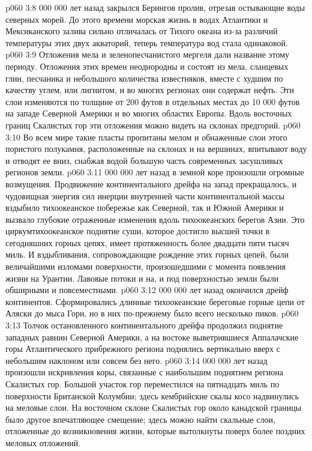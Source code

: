\vs p060 3:8  000 000 лет назад закрылся Берингов пролив, отрезав остывающие воды северных морей. До этого времени морская жизнь в водах Атлантики и Мексиканского залива сильно отличалась от Тихого океана из\hyp{}за различий температуры этих двух акваторий, теперь температура вод стала одинаковой.
\vs p060 3:9 Отложения мела и зеленопесчанистого мергеля дали название этому периоду. Отложения этих времен неоднородны и состоят из мела, сланцевых глин, песчаника и небольшого количества известняков, вместе с худшим по качеству углем, или лигнитом, и во многих регионах они содержат нефть. Эти слои изменяются по толщине от 200 футов в отдельных местах до 10 000 футов на западе Северной Америки и во многих областях Европы. Вдоль восточных границ Скалистых гор эти отложения можно видеть на склонах предгорий.
\vs p060 3:10 Во всем мире такие пласты пропитаны мелом и обнаженные слои этого пористого полукамня, расположенные на склонах и на вершинах, впитывают воду и отводят ее вниз, снабжая водой большую часть современных засушливых регионов земли.
\vs p060 3:11  000 000 лет назад в земной коре произошли огромные возмущения. Продвижение континентального дрейфа на запад прекращалось, и чудовищная энергия сил инерции внутренней части континентальной массы вздыбило тихоокеанское побережье как Северной, так и Южной Америки и вызвало глубокие отраженные изменения вдоль тихоокеанских берегов Азии. Это циркумтихоокеанское поднятие суши, которое достигло высшей точки в сегодняшних горных цепях, имеет протяженность более двадцати пяти тысяч миль. И вздыбливания, сопровождающие рождение этих горных цепей, были величайшими изломами поверхности, произошедшими с момента появления жизни на Урантии. Лавовые потоки и на, и под поверхностью земли были обширными и повсеместными.
\vs p060 3:12  000 000 лет назад окончился дрейф континентов. Сформировались длинные тихоокеанские береговые горные цепи от Аляски до мыса Горн, но в них по\hyp{}прежнему было всего несколько пиков.
\vs p060 3:13 Толчок остановленного континентального дрейфа продолжил поднятие западных равнин Северной Америки, а на востоке выветрившиеся Аппалачские горы Атлантического прибрежного региона поднялись вертикально вверх с небольшим наклоном или совсем без него.
\vs p060 3:14  000 000 лет назад произошли искривления коры, связанные с наибольшим поднятием региона Скалистых гор. Большой участок гор переместился на пятнадцать миль по поверхности Британской Колумбии; здесь кембрийские скалы косо надвинулись на меловые слои. На восточном склоне Скалистых гор около канадской границы было другое впечатляющее смещение; здесь можно найти скальные слои, отложенные до возникновения жизни, которые вытолкнуты поверх более поздних меловых отложений.
